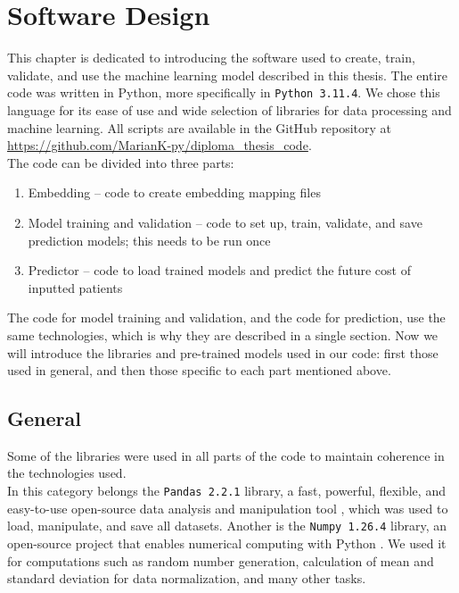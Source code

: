 
\chapter{Software Design} \label{chap:softwaredesign}

This chapter is dedicated to introducing the software used to create, train, validate, and use the machine learning model described in this thesis. The entire code was written in Python, more specifically in \texttt{Python 3.11.4}. We chose this language for its ease of use and wide selection of libraries for data processing and machine learning. All scripts are available in the GitHub repository at \url{https://github.com/MarianK-py/diploma_thesis_code}.
\\

The code can be divided into three parts:

\begin{enumerate}
	\item Embedding – code to create embedding mapping files
	\item Model training and validation – code to set up, train, validate, and save prediction models; this needs to be run once
	\item Predictor – code to load trained models and predict the future cost of inputted patients
\end{enumerate}

The code for model training and validation, and the code for prediction, use the same technologies, which is why they are described in a single section. Now we will introduce the libraries and pre-trained models used in our code: first those used in general, and then those specific to each part mentioned above.

\section{General}

Some of the libraries were used in all parts of the code to maintain coherence in the technologies used.
\\

In this category belongs the \texttt{Pandas 2.2.1} library, a fast, powerful, flexible, and easy-to-use open-source data analysis and manipulation tool \cite{pandas}, which was used to load, manipulate, and save all datasets. Another is the \texttt{Numpy 1.26.4} library, an open-source project that enables numerical computing with Python \cite{numpy}. We used it for computations such as random number generation, calculation of mean and standard deviation for data normalization, and many other tasks.



